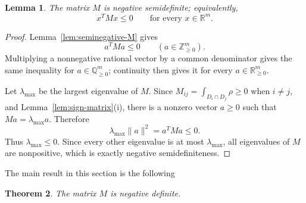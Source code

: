 \documentclass[reqno]{amsart}
\theoremstyle{remark}
\def\R{\mathbb{R}}
\theoremstyle{plain}
\newtheorem{thm}{Theorem}
\newtheorem{lemma}[thm]{Lemma}
\begin{document}
\begin{lemma}\label{lem:semidefinite}
The matrix $M$ is negative semidefinite; equivalently,
\[
 x^TMx\leq0\qquad\text{for every }x\in\R^m.
\]
\end{lemma}

\begin{proof}
Lemma~\ref{lem:seminegative-M} gives
\[
 a^TMa\leq0\qquad(a\in\mathbb Z_{\geq0}^m).
\]
Multiplying a nonnegative rational vector by a common denominator gives
the same inequality for $a\in\mathbb Q_{\geq0}^m$; continuity then
gives it for every $a\in\R_{\geq0}^m$.

Let $\lambda_{\max}$ be the largest eigenvalue of $M$.
Since $M_{ij}=\int_{D_i\cap D_j}\rho\geq 0$ when $i\neq j$, and Lemma~\ref{lem:sign-matrix}(i), there is a
nonzero vector $a\geq0$ such that
$Ma=\lambda_{\max}a$.  Therefore
\[
 \lambda_{\max}\lVert a\rVert^2=a^TMa\leq0.
\]
Thus $\lambda_{\max}\leq0$.  Since every other eigenvalue is at most
$\lambda_{\max}$, all eigenvalues of $M$ are nonpositive, which is
exactly negative semidefiniteness.
\end{proof}
The main result in this section is the following 
\begin{thm}\label{thm:negative}
The matrix $M$ is negative definite.
\end{thm}
\end{document}
